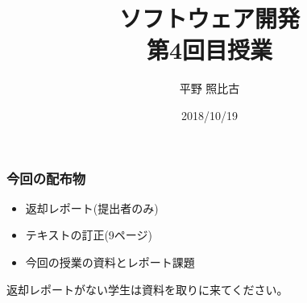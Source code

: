 %
%

\title{ソフトウェア開発\\第4回目授業}
\author{平野 照比古}
\institute{}
\date{2018/10/19}

  \begin{frame}[containsverbatim]
   \frametitle{今回の配布物}
   \begin{itemize}
    \item 返却レポート(提出者のみ)
    \item テキストの訂正(9ページ)
    \item 今回の授業の資料とレポート課題
   \end{itemize}
返却レポートがない学生は資料を取りに来てください。
  \end{frame}
 \frame{\maketitle}

